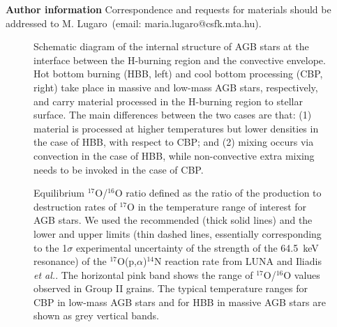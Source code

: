 \documentclass{nature}
\newcommand{\iso}[2]{\hbox{${}^{#1}${#2}}}
\begin{document}
{\bf Author information}
Correspondence and requests for materials
should be addressed to M. Lugaro~(email: maria.lugaro@csfk.mta.hu).


\begin{figure}
\caption{Schematic diagram of the internal structure of AGB stars at the interface between the 
H-burning region and the convective envelope. Hot bottom burning (HBB, left) and cool 
bottom processing (CBP, right) take place in massive and low-mass AGB stars, 
respectively, and carry material processed in the H-burning region to stellar surface. The main 
differences between the two cases are that: (1) material is processed at higher 
temperatures but lower densities in the case of HBB, with respect to CBP; and (2) 
mixing occurs via convection in the case of HBB, while 
non-convective extra mixing needs to be invoked in the case of CBP.
\label{fig:scheme}}
\end{figure}

\begin{figure}
\caption{Equilibrium \iso{17}O/\iso{16}O ratio defined as the 
ratio of the production to destruction rates of \iso{17}O in the temperature range of
interest for AGB stars. We used the recommended (thick solid lines)
and the lower and
upper limits (thin dashed lines, essentially corresponding to the 1$\sigma$
experimental uncertainty of the
strength of the 64.5~keV resonance) of the \iso{17}O(p,$\alpha$)\iso{14}N reaction rate from  
LUNA\cite{bruno16} and Iliadis {\it et al.}\cite{iliadis10}. 
The horizontal pink band 
shows the range of \iso{17}O/\iso{16}O values observed in Group II grains.
The typical temperature ranges for CBP 
in low-mass AGB stars and for HBB in massive AGB stars  
are shown as grey vertical bands.
\label{fig:ratiorates}}
\end{figure}
\end{document}
